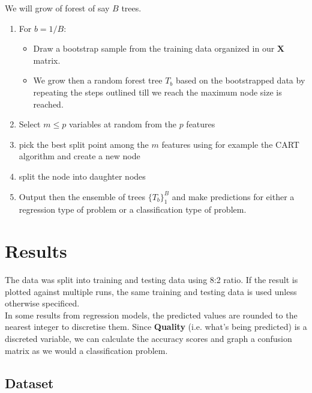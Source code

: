 \documentclass[english,notitlepage,reprint,nofootinbib]{revtex4-1}
\begin{document}
We will grow of forest of say $B$ trees. 
\begin{enumerate}
	\item  For $b=1/B$: 
		\begin{itemize}
			\item Draw a bootstrap sample from the training data organized in our $\boldsymbol{X}$ matrix.
			\item We grow then a random forest tree $T_b$ based on the bootstrapped data by repeating the steps outlined till we reach the maximum node size is reached. 
		\end{itemize}

	\item Select $m \le p$ variables at random from the $p$ features
	\item pick the best split point among the $m$ features using for example the CART algorithm and create a new node
	\item split the node into daughter nodes
	\item Output then the ensemble of trees $\{T_b\}_1^{B}$ and make predictions for either a regression type of problem or a classification type of problem. 
\end{enumerate} \cite{hjorth-jensen}
%

\section{Results}\label{sec:results}
%
The data was split into training and testing data using 8:2 ratio. If the result is plotted against multiple runs, the same training and testing data is used unless otherwise specificed. \\
In some results from regression models, the predicted values are rounded to the nearest integer to discretise them. Since \textbf{Quality} (i.e. what's being predicted) is a discreted variable, we can calculate the accuracy scores and graph a confusion matrix as we would a classification problem. 
\subsection{Dataset}
\end{document}
